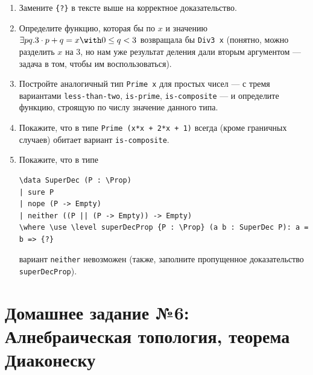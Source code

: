 \documentclass[10pt,a4paper,oneside]{article}
\begin{document}
\begin{enumerate}
\begin{enumerate}
\item Замените \verb!{?}! в тексте выше на корректное доказательство.
\item Определите функцию, которая бы по $x$ и значению $\exists p q.3 \cdot p + q = x \with 0 \le q < 3$ возвращала бы \verb!Div3 x!
(понятно, можно разделить $x$ на 3, но нам уже результат деления дали вторым аргументом --- задача в том, чтобы им воспользоваться).
\item Постройте аналогичный тип \verb!Prime x! для простых чисел --- с тремя вариантами \verb!less-than-two!, \verb!is-prime!, 
\verb!is-composite! --- и определите функцию, строящую по числу значение данного типа.
\item Покажите, что в типе \verb!Prime (x*x + 2*x + 1)! всегда (кроме граничных случаев) обитает вариант \verb!is-composite!.
\item Покажите, что в типе 
\begin{verbatim}
\data SuperDec (P : \Prop)
| sure P
| nope (P -> Empty)
| neither ((P || (P -> Empty)) -> Empty)
\where \use \level superDecProp {P : \Prop} (a b : SuperDec P): a = b => {?}
\end{verbatim}
вариант \verb!neither! невозможен (также, заполните пропущенное доказательство \verb!superDecProp!).
\end{enumerate}
\end{enumerate}


\section*{Домашнее задание №6: Алнебраическая топология, теорема Диаконеску}
\end{document}
